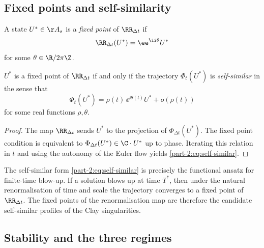 \subsection{Fixed points and self-similarity}
\label{part-2:ssec:fixed-points}

\begin{definition}\label{part-2:def:fixed-point}
A state $U^\ast\in\AA_s$ is a \emph{fixed point} of $\RR_{\Delta t}$ if
\begin{equation}\label{part-2:eq:fixed-point}
\RR_{\Delta t}(U^\ast) = \ee^{\ii\theta}U^\ast
\end{equation}
for some $\theta\in\R/2\pi\Z$.
\end{definition}

\begin{proposition}\label{part-2:prop:fixed-char}
$U^\ast$ is a fixed point of $\RR_{\Delta t}$ if and only if the 
trajectory $\Phi_t(U^\ast)$ is \emph{self-similar} in the sense that
\begin{equation}\label{part-2:eq:self-similar}
\Phi_t(U^\ast) = \rho(t)\,\ee^{\ii\theta(t)} U^\ast + o(\rho(t))
\end{equation}
for some real functions $\rho,\theta$.
\end{proposition}

\begin{proof}
The map $\RR_{\Delta t}$ sends $U^\ast$ to the projection of 
$\Phi_{\Delta t}(U^\ast)$. The fixed point condition is equivalent to 
$\Phi_{\Delta t}(U^\ast) \in \C\cdot U^\ast$ up to phase. Iterating 
this relation in $t$ and using the autonomy of the Euler flow yields 
\eqref{part-2:eq:self-similar}.
\end{proof}

\begin{remark}\label{part-2:rem:fixed-blowup}
The self-similar form \eqref{part-2:eq:self-similar} is precisely the 
functional ansatz for finite-time blow-up. If a solution blows up at 
time $T^\ast$, then under the natural renormalisation of time and 
scale the trajectory converges to a fixed point of $\RR_{\Delta t}$. 
The fixed points of the renormalisation map are therefore the 
candidate self-similar profiles of the Clay singularities.
\end{remark}

\subsection{Stability and the three regimes}
\label{part-2:ssec:three-regimes}

